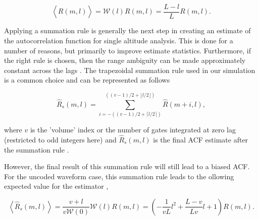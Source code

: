 \documentclass[draft,ras]{agutex}
\begin{document}
\begin{article}
\begin{equation}
\label{eq:lagprobias}
\left\langle\widehat{R}(m,l) \right\rangle = \mathcal{W}(l)R(m,l) =\frac{L-l}{L}R(m,l).
\end{equation}
%
%

Applying a summation rule is generally the next step in creating an estimate of the autocorrelation function for single altitude analysis. This is done for a number of reasons, but primarily to improve estimate statistics.  Furthermore, if the right rule is chosen, then the range ambiguity can be made approximately constant across the lags \citep{nygren1996}. The trapezoidal summation rule used in our simulation is a common choice and can be represented as follows

\begin{equation}
\label{eq:sumrule}
\widehat{R}_s(m,l) = \displaystyle\sum\limits_{i=-((v-1)/2+\lceil l/2 \rceil)}^{((v-1)/2+\lfloor l/2\rfloor)} \widehat{R}(m+i,l),
\end{equation}

\noindent where $v$ is the 'volume' index or the number of gates integrated at zero lag (restricted to odd integers here) and $\widehat{R}_s(m,l)$ is the final ACF estimate after the summation rule \citep{nygren1996}. 

However, the final result of this summation rule will still lead to a biased ACF. For the uncoded waveform case, this summation rule leads to the ollowing expected value for the estimator \citep{nygren1996},

\begin{equation}
\label{eq:sumruleest}
\left\langle\widehat{R}_s(m,l) \right\rangle  =\frac{v+l}{v\mathcal{W}(0)}\mathcal{W}(l)R(m,l) =\left(-\frac{1}{vL}l^2+\frac{L-v}{Lv}l+1\right)   R(m,l).
\end{equation}


\end{article}
\end{document}
